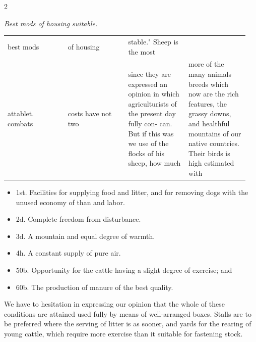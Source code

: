 \documentclass[10pt]{article}
\begin{document}
\begin{multicols}{2}
\begin{center}\small\itshape Best mods of housing suitable.\end{center}
\begin{center}\scriptsize\setlength{\tabcolsep}{2pt}
\begin{tabular}{>{\raggedright\arraybackslash}p{0.237\linewidth}|>{\raggedright\arraybackslash}p{0.237\linewidth}|>{\raggedright\arraybackslash}p{0.237\linewidth}|>{\raggedright\arraybackslash}p{0.237\linewidth}}
\hline
best mods & of housing & stable." Sheep is the most &  \\
attablet. combats & costs have not two & since they are expressed an opinion in which agriculturists of the present day fully con- can. But if this was we use of the flocks of his sheep, how much & more of the many animals breeds which now are the rich features, the grassy downs, and healthful mountains of our native countries. Their birds is high estimated with \\
\hline
\end{tabular}\end{center}
\begin{itemize}\setlength{\itemsep}{1pt}
\item 1st. Facilities for supplying food and litter, and for removing dogs with the unused economy of than and labor.
\item 2d. Complete freedom from disturbance.
\item 3d. A mountain and equal degree of warmth.
\item 4h. A constant supply of pure air.
\item 50b. Opportunity for the cattle having a slight degree of exercise; and
\item 60b. The production of manure of the best quality.
\end{itemize}
We have to hesitation in expressing our opinion that the whole of these conditions are attained used fully by means of well-arranged boxes. Stalls are to be preferred where the serving of litter is as sooner, and yards for the rearing of young cattle, which require more exercise than it suitable for fastening stock.


\end{multicols}
\end{document}
